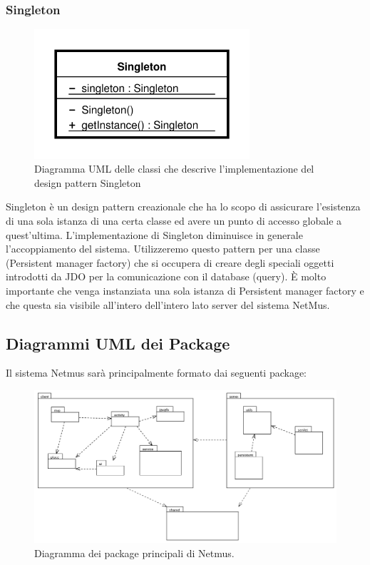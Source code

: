 \subsubsection{Singleton}
\begin{figure}[h]
\centering
\includegraphics[width=8cm]{img/ST/Singleton.png}
\caption{Diagramma UML delle classi che descrive l'implementazione del design
pattern Singleton}
\end{figure}
Singleton \`e un design pattern creazionale che ha lo scopo di assicurare
l'esistenza di una sola istanza di una certa classe ed avere un punto di accesso
globale a quest'ultima. 
L'implementazione di Singleton diminuisce in generale l'accoppiamento del
sistema.
Utilizzeremo questo pattern per una classe (Persistent manager factory) che si
occupera di creare degli speciali oggetti introdotti da JDO per la
comunicazione con il database (query). \`E molto importante che venga instanziata una sola
istanza di Persistent manager factory e che questa sia visibile all'intero
dell'intero lato server del sistema NetMus. 

\newpage
\subsection{Diagrammi UML dei Package}
Il sistema Netmus sar\`a principalmente formato dai seguenti package:
\begin{figure}[h]
  \centering
  \includegraphics[width=16cm]{img/ST/PackageGeneric.png}
\caption{Diagramma dei package principali di Netmus.}
\end{figure}

